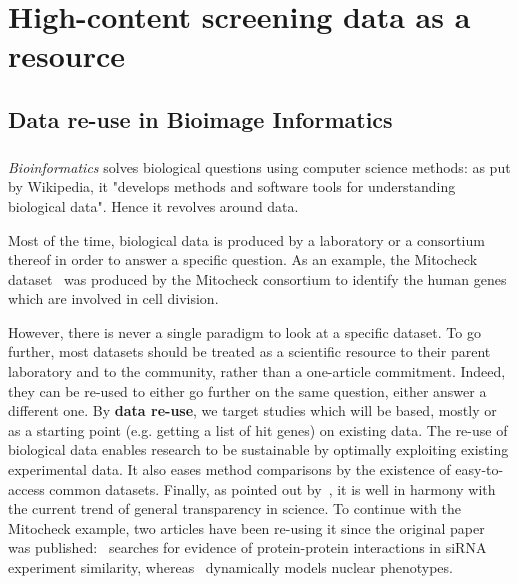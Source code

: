 
\chapter{High-content screening data as a resource}
\label{chap:reuse}
\section{Data re-use in Bioimage Informatics}
\paragraph*{}
\textit{Bioinformatics} solves biological questions using computer science methods: as put by Wikipedia, it "develops methods and software tools for understanding biological data". Hence it revolves around data.

Most of the time, biological data is produced by a laboratory or a consortium thereof in order to answer a specific question. As an example, the Mitocheck dataset~\cite{pmid20360735} was produced by the Mitocheck consortium to identify the human genes which are involved in cell division. 

However, there is never a single paradigm to look at a specific dataset. To go further, most datasets should be treated as a scientific resource to their parent laboratory and to the community, rather than a one-article commitment. Indeed, they can be re-used to either go further on the same question, either answer a different one. By \textbf{data re-use}, we target studies which will be based, mostly or as a starting point (e.g. getting a list of hit genes) on existing data. The re-use of biological data enables research to be sustainable by optimally exploiting existing experimental data. It also eases method comparisons by the existence of easy-to-access common datasets. Finally, as pointed out by~\cite{pmid24904347}, it is well in harmony with the current trend of general transparency in science. To continue with the Mitocheck example, two articles have been re-using it since the original paper ~\cite{pmid20360735} was published:~\cite{pmid25255318} searches for evidence of protein-protein interactions in siRNA experiment similarity, whereas~\cite{pmid24131777} dynamically models nuclear phenotypes.

